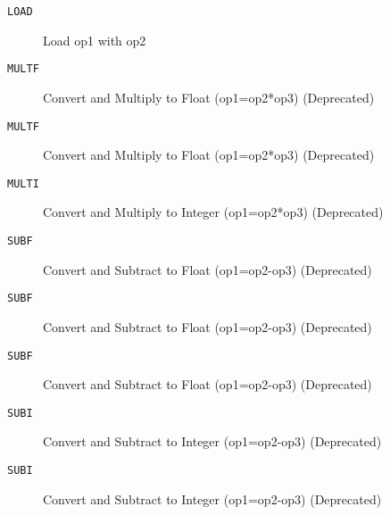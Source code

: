 
\begin{description}
\item[\texttt{LOAD       }]  Load op1 with op2\\
\end{description}

\begin{description}
\item[\texttt{MULTF      }]  Convert and Multiply to Float (op1=op2*op3) (Deprecated)\\
\end{description}

\begin{description}
\item[\texttt{MULTF      }]  Convert and Multiply to Float (op1=op2*op3) (Deprecated)\\
\end{description}

\begin{description}
\item[\texttt{MULTI      }]  Convert and Multiply to Integer (op1=op2*op3) (Deprecated)\\
\end{description}

\begin{description}
\item[\texttt{SUBF       }]  Convert and Subtract to Float (op1=op2-op3) (Deprecated)\\
\end{description}

\begin{description}
\item[\texttt{SUBF       }]  Convert and Subtract to Float (op1=op2-op3) (Deprecated)\\
\end{description}

\begin{description}
\item[\texttt{SUBF       }]  Convert and Subtract to Float (op1=op2-op3) (Deprecated)\\
\end{description}

\begin{description}
\item[\texttt{SUBI       }]  Convert and Subtract to Integer (op1=op2-op3) (Deprecated)\\
\end{description}

\begin{description}
\item[\texttt{SUBI       }]  Convert and Subtract to Integer (op1=op2-op3) (Deprecated)\\
\end{description}


